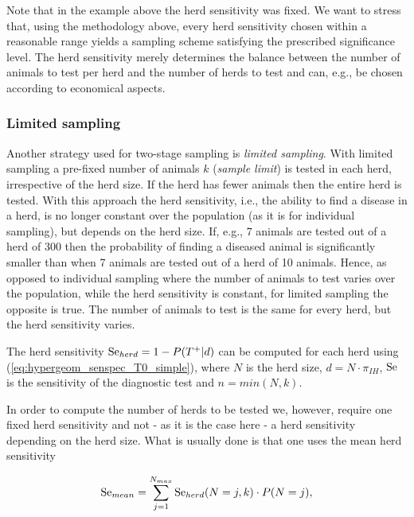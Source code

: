 \documentclass[nojss]{jss}
\begin{document}
Note that in the example above the herd sensitivity was fixed. We 
want to stress that, using the methodology above, every herd 
sensitivity chosen within a reasonable range yields a sampling 
scheme satisfying the prescribed significance level. The herd 
sensitivity merely determines the balance between the number of 
animals to test per herd and the number of herds to test and can, 
e.g., be chosen according to economical aspects. 



\subsubsection{Limited sampling} \label{subsubsec:ltd-sampling}

Another strategy used for two-stage sampling is \emph{limited 
sampling}. With limited sampling a pre-fixed number of animals $k$ 
(\emph{sample limit}) is tested in each herd, irrespective of the 
herd size. If the herd has fewer animals then the entire herd is 
tested. With this approach the herd sensitivity, i.e., the ability 
to find a disease in a herd, is no longer constant over the 
population (as it is for individual sampling), but depends on the 
herd size. If, e.g., 7 animals are tested out of a herd of 300 then 
the probability of finding a diseased animal is significantly 
smaller than when 7 animals are tested out of a herd of 10 animals. 
Hence, as opposed to individual sampling where the number of animals 
to test varies over the population, while the herd sensitivity is 
constant, for limited sampling the opposite is true. The number of 
animals to test is the same for every herd, but the herd sensitivity 
varies. 

The herd sensitivity $\mbox{Se}_{herd} = 1 - P(T^+|d)$ can be computed for 
each herd using (\ref{eq:hypergeom_senspec_T0_simple}), where $N$ is 
the herd size, $d=N\cdot \pi_{IH}$, $\mbox{Se}$ is the sensitivity of the 
diagnostic test and $n=min(N,k)$. 

In order to compute the number of herds to be tested we, however, 
require one fixed herd sensitivity and not - as it is the case here 
- a herd sensitivity depending on the herd size. What is usually 
done is that one uses the mean herd sensitivity 

\begin{equation}
%
\Se_{mean} = \sum_{j = 1}^{N_{max}} \Se_{herd}(N=j,k)\cdot P(N=j),
%
\end{equation}
  
\end{document}
